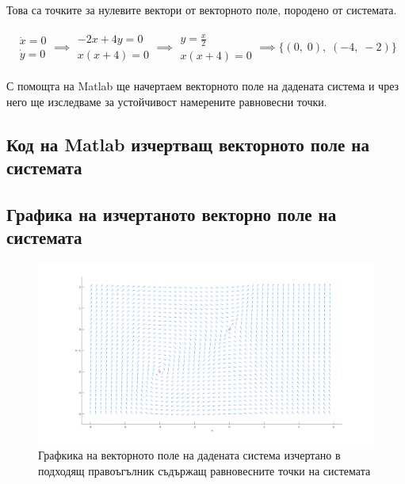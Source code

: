 \documentclass[a4paper, 12pt]{article}
\begin{document}
Това са точките за нулевите вектори от векторното поле, породено от системата.

\begin{align*} 
    \begin{array}{|l}
        \dot{x} = 0 \\
        \dot{y} = 0
    \end{array} \implies \begin{array}{|l}
        -2x + 4y = 0 \\
        x(x + 4) = 0    
    \end{array} \implies \begin{array}{|l}
        y = \frac{x}{2} \\
        x(x + 4) = 0
    \end{array} \implies \{(0, \; 0), \; (-4, \; -2)\}
\end{align*}

С помощта на Matlab ще начертаем векторното
поле на дадената система и чрез него ще изследваме
за устойчивост намерените равновесни точки.

\subsection{Код на Matlab изчертващ векторното поле на системата}



\subsection{Графика на изчертаното векторно поле на системата}

\begin{figure}[ht]
    \centering
    \includegraphics[width=\textwidth]{vectorField.png}
    \caption{Графкика на векторното поле на дадената система изчертано в подходящ правоъгълник съдържащ равновесните точки на системата}
\end{figure}
\end{document}
